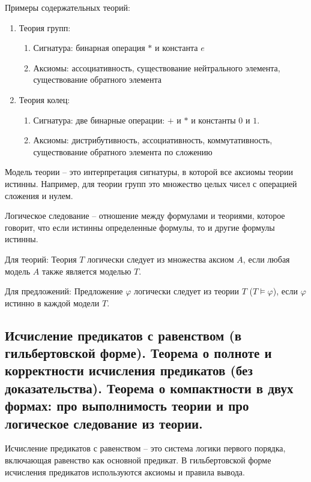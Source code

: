 \documentclass[a4paper, 10pt]{article}
\begin{document}
\hfill

Примеры содержательных теорий:

\begin{enumerate}
    \item Теория групп:
    \begin{enumerate}
        \item Сигнатура: бинарная операция $*$ и константа $e$
        \item Аксиомы: ассоциативность, существование нейтрального элемента, существование обратного элемента
    \end{enumerate}
    \item Теория колец:
    \begin{enumerate}
        \item Сигнатура: две бинарные операции: $+$ и $*$ и константы $0$ и $1$.
        \item Аксиомы: дистрибутивность, ассоциативность, коммутативность, существование обратного элемента по сложению
    \end{enumerate}
\end{enumerate}

Модель теории -- это интерпретация сигнатуры, в которой все аксиомы теории истинны. Например, для теории групп это множество целых чисел с операцией сложения и нулем.

\hfill

Логическое следование -- отношение между формулами и теориями, которое говорит, что если истинны определенные формулы, то и другие формулы истинны.

Для теорий: Теория $T$ логически следует из множества аксиом $A$, если любая модель $A$ также является моделью $T$.

Для предложений: Предложение $\varphi$ логически следует из теории $T$ ($T\models\varphi$), если $\varphi$ истинно в каждой модели $T$.

\subsection{Исчисление предикатов с равенством (в гильбертовской форме). Теорема о полноте и корректности исчисления предикатов (без доказательства). Теорема о компактности в двух формах: про выполнимость теории и про логическое следование из теории.}

Исчисление предикатов с равенством -- это система логики первого порядка, включающая равенство как основной предикат. В гильбертовской форме исчисления предикатов используются аксиомы и правила вывода.
\end{document}
